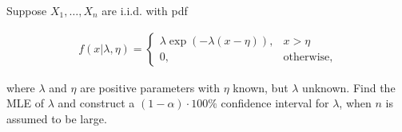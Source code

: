
\begin{exercise}

Suppose $X_1,\dots,X_n$ are i.i.d. with pdf

\begin{align*}
  f(x | \lambda, \eta) = \begin{cases}
    \lambda \exp(-\lambda (x - \eta)), & x > \eta \\
    0, & \text{otherwise},
  \end{cases}
\end{align*}

where $\lambda$ and $\eta$ are positive parameters with $\eta$ known,
but $\lambda$ unknown. Find the MLE of $\lambda$ and construct a
$(1 - \alpha)\cdot 100\%$ confidence interval for $\lambda$, when $n$
is assumed to be large.

\end{exercise}


